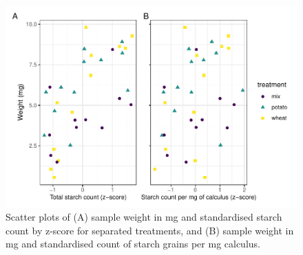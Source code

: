 \documentclass[utf8]{frontiers/frontiersSCNS}
\begin{document}
\begin{figure}[H]

{\centering \includegraphics{../figures/cor-plot-1} 

}

\caption{Scatter plots of (A) sample weight in mg and standardised starch count by z-score for separated treatments, and (B) sample weight in mg and standardised count of starch grains per mg calculus.}\label{fig:cor-plot}
\end{figure}
\end{document}
